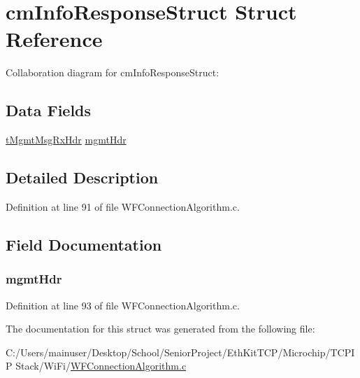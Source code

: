 \hypertarget{structcm_info_response_struct}{}\section{cm\+Info\+Response\+Struct Struct Reference}
\label{structcm_info_response_struct}


Collaboration diagram for cm\+Info\+Response\+Struct\+:
\subsection*{Data Fields}
\begin{DoxyCompactItemize}
\item 
\hyperlink{_w_f_mgmt_msg_8h_aaec9ea808e7028d854dc40394ff6f6b5}{t\+Mgmt\+Msg\+Rx\+Hdr} \hyperlink{structcm_info_response_struct_a7267478e6419a759f2c5eaa97eaacab7}{mgmt\+Hdr}
\end{DoxyCompactItemize}


\subsection{Detailed Description}


Definition at line 91 of file W\+F\+Connection\+Algorithm.\+c.



\subsection{Field Documentation}
\hypertarget{structcm_info_response_struct_a7267478e6419a759f2c5eaa97eaacab7}{}
\subsubsection[{mgmt\+Hdr}]{ mgmt\+Hdr}\label{structcm_info_response_struct_a7267478e6419a759f2c5eaa97eaacab7}


Definition at line 93 of file W\+F\+Connection\+Algorithm.\+c.



The documentation for this struct was generated from the following file\+:\begin{DoxyCompactItemize}
\item 
C\+:/\+Users/mainuser/\+Desktop/\+School/\+Senior\+Project/\+Eth\+Kit\+T\+C\+P/\+Microchip/\+T\+C\+P\+I\+P Stack/\+Wi\+Fi/\hyperlink{_w_f_connection_algorithm_8c}{W\+F\+Connection\+Algorithm.\+c}\end{DoxyCompactItemize}

